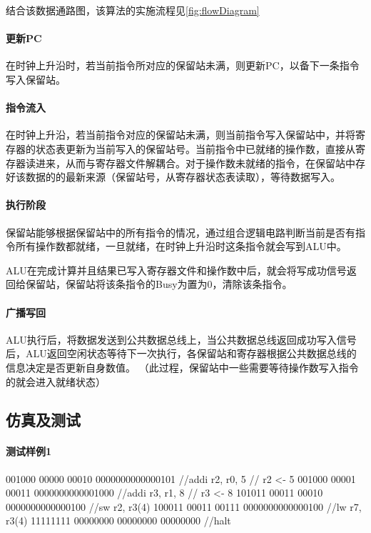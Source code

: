\documentclass[twoside]{article}
\begin{document}
结合该数据通路图，该算法的实施流程见\autoref{fig:flowDiagram}
\paragraph{更新PC}
在时钟上升沿时，若当前指令所对应的保留站未满，则更新PC，以备下一条指令写入保留站。

\paragraph{指令流入}
在时钟上升沿，若当前指令对应的保留站未满，则当前指令写入保留站中，并将寄存器的状态表更新为当前写入的保留站号。当前指令中已就绪的操作数，直接从寄存器读进来，从而与寄存器文件解耦合。对于操作数未就绪的指令，在保留站中存好该数据的的最新来源（保留站号，从寄存器状态表读取），等待数据写入。

\paragraph{执行阶段}
保留站能够根据保留站中的所有指令的情况，通过组合逻辑电路判断当前是否有指令所有操作数都就绪，一旦就绪，在时钟上升沿时这条指令就会写到ALU中。

ALU在完成计算并且结果已写入寄存器文件和操作数中后，就会将写成功信号返回给保留站，保留站将该条指令的Busy为置为0，清除该条指令。

\paragraph{广播写回}
ALU执行后，将数据发送到公共数据总线上，当公共数据总线返回成功写入信号后，ALU返回空闲状态等待下一次执行，各保留站和寄存器根据公共数据总线的信息决定是否更新自身数值。
（此过程，保留站中一些需要等待操作数写入指令的就会进入就绪状态）




\subsection{仿真及测试}

\paragraph{测试样例1}

\begin{verilogcode}
    001000 00000 00010 0000000000000101 //addi r2, r0, 5 // r2 <- 5
    001000 00001 00011 0000000000001000 //addi r3, r1, 8 // r3 <- 8
    101011 00011 00010 0000000000000100 //sw r2, r3(4)
    100011 00011 00111 0000000000000100 //lw r7, r3(4)
    11111111 00000000 00000000 00000000 //halt
\end{verilogcode}
\end{document}
